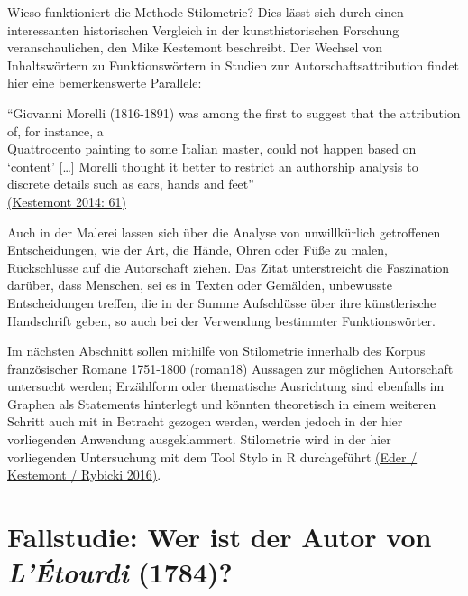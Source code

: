 \documentclass[
  letterpaper,
  DIV=11,
  numbers=noendperiod]{scrreprt}
\begin{document}
Wieso funktioniert die Methode Stilometrie? Dies lässt sich durch einen
interessanten historischen Vergleich in der kunsthistorischen Forschung
veranschaulichen, den Mike Kestemont beschreibt. Der Wechsel von
Inhaltswörtern zu Funktionswörtern in Studien zur
Autorschaftsattribution findet hier eine bemerkenswerte Parallele:

``Giovanni Morelli (1816-1891) was among the first to suggest that the
attribution of, for instance, a\\
Quattrocento painting to some Italian master, could not happen based on
`content' {[}\ldots{]} Morelli thought it better to restrict an
authorship analysis to discrete details such as ears, hands and feet''\\
\href{https://www.zotero.org/google-docs/?dWQiXi}{(Kestemont 2014: 61)}

Auch in der Malerei lassen sich über die Analyse von unwillkürlich
getroffenen Entscheidungen, wie der Art, die Hände, Ohren oder Füße zu
malen, Rückschlüsse auf die Autorschaft ziehen. Das Zitat unterstreicht
die Faszination darüber, dass Menschen, sei es in Texten oder Gemälden,
unbewusste Entscheidungen treffen, die in der Summe Aufschlüsse über
ihre künstlerische Handschrift geben, so auch bei der Verwendung
bestimmter Funktionswörter.

Im nächsten Abschnitt sollen mithilfe von Stilometrie innerhalb des
Korpus französischer Romane 1751-1800 (roman18) Aussagen zur möglichen
Autorschaft untersucht werden; Erzählform oder thematische Ausrichtung
sind ebenfalls im Graphen als Statements hinterlegt und könnten
theoretisch in einem weiteren Schritt auch mit in Betracht gezogen
werden, werden jedoch in der hier vorliegenden Anwendung ausgeklammert.
Stilometrie wird in der hier vorliegenden Untersuchung mit dem Tool
Stylo in R durchgeführt
\href{https://www.zotero.org/google-docs/?g9mj28}{(Eder / Kestemont /
Rybicki 2016)}.

\section{\texorpdfstring{Fallstudie: Wer ist der Autor von
\emph{L'Étourdi}
(1784)?}{Fallstudie: Wer ist der Autor von L'Étourdi (1784)?}}\label{fallstudie-wer-ist-der-autor-von-luxe9tourdi-1784}
\end{document}
